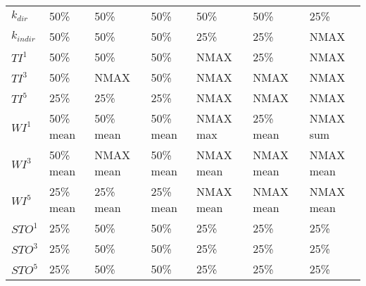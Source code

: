 \begin{table}[ht]
\begin{tabular}{lllllll}
\(\displaystyle k_{dir} \) &   {\color[HTML]{00D768} 50\% } & {\color[HTML]{EF2A00} 50\% } & {\color[HTML]{0051D7} 50\% } & {\color{orange} 50\% } & {\color[HTML]{6200D7} 50\% } & {\color[HTML]{9B9B9B} 25\% } \\ 
\(\displaystyle k_{indir} \) &   {\color[HTML]{EF2A00} 50\% } & {\color[HTML]{00D768} 50\% } & {\color[HTML]{0051D7} 50\% } & {\color[HTML]{6200D7} 25\% } & {\color{orange} 25\% } & {\color[HTML]{9B9B9B} NMAX } \\ 
\(\displaystyle TI^1 \) &   {\color[HTML]{EF2A00} 50\% } & {\color[HTML]{00D768} 50\% } & {\color[HTML]{0051D7} 50\% } & {\color[HTML]{6200D7} NMAX } & {\color{orange} 25\% } & {\color[HTML]{9B9B9B} NMAX } \\ 
\(\displaystyle TI^3 \) &   {\color[HTML]{EF2A00} 50\% } & {\color[HTML]{00D768} NMAX } & {\color[HTML]{0051D7} 50\% } & {\color{orange} NMAX } & {\color[HTML]{6200D7} NMAX } & {\color[HTML]{9B9B9B} NMAX } \\ 
\(\displaystyle TI^5 \) &   {\color[HTML]{EF2A00} 25\% } & {\color[HTML]{00D768} 25\% } & {\color[HTML]{0051D7} 25\% } & {\color{orange} NMAX } & {\color[HTML]{6200D7} NMAX } & {\color[HTML]{9B9B9B} NMAX } \\ 
\(\displaystyle WI^1 \) &   {\color[HTML]{EF2A00} 50\% mean} & {\color[HTML]{00D768} 50\% mean} & {\color[HTML]{0051D7} 50\% mean} & {\color[HTML]{6200D7} NMAX max} & {\color{orange} 25\% mean} & {\color[HTML]{9B9B9B} NMAX sum} \\ 
\(\displaystyle WI^3 \) &   {\color[HTML]{EF2A00} 50\% mean} & {\color[HTML]{00D768} NMAX mean} & {\color[HTML]{0051D7} 50\% mean} & {\color{orange} NMAX mean} & {\color[HTML]{6200D7} NMAX mean} & {\color[HTML]{9B9B9B} NMAX mean} \\ 
\(\displaystyle WI^5 \) &   {\color[HTML]{EF2A00} 25\% mean} & {\color[HTML]{00D768} 25\% mean} & {\color[HTML]{0051D7} 25\% mean} & {\color{orange} NMAX mean} & {\color[HTML]{6200D7} NMAX mean} & {\color[HTML]{9B9B9B} NMAX mean} \\ 
\(\displaystyle STO^1 \) &   {\color[HTML]{00D768} 25\% } & {\color[HTML]{EF2A00} 50\% } & {\color[HTML]{0051D7} 50\% } & {\color{orange} 25\% } & {\color[HTML]{6200D7} 25\% } & {\color[HTML]{9B9B9B} 25\% } \\ 
\(\displaystyle STO^3 \) &   {\color[HTML]{00D768} 25\% } & {\color[HTML]{EF2A00} 50\% } & {\color[HTML]{0051D7} 50\% } & {\color{orange} 25\% } & {\color[HTML]{6200D7} 25\% } & {\color[HTML]{9B9B9B} 25\% } \\ 
\(\displaystyle STO^5 \) &   {\color[HTML]{00D768} 25\% } & {\color[HTML]{EF2A00} 50\% } & {\color[HTML]{0051D7} 50\% } & {\color[HTML]{6200D7} 25\% } & {\color{orange} 25\% } & {\color[HTML]{9B9B9B} 25\% } \\ 

\end{tabular}
\end{table}
